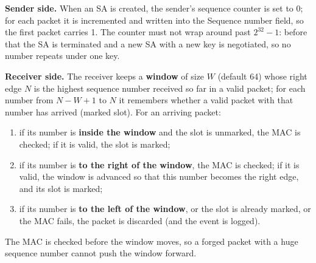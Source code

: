 \textbf{Sender side.} When an SA is created, the sender's sequence counter is set to 0; for each packet it is incremented and written into the Sequence number field, so the first packet carries 1. The counter must not wrap around past $2^{32} - 1$: before that the SA is terminated and a new SA with a new key is negotiated, so no number repeats under one key.

\textbf{Receiver side.} The receiver keeps a \textbf{window} of size $W$ (default 64) whose right edge $N$ is the highest sequence number received so far in a valid packet; for each number from $N - W + 1$ to $N$ it remembers whether a valid packet with that number has arrived (marked slot). For an arriving packet:
\begin{enumerate}
  \item if its number is \textbf{inside the window} and the slot is unmarked, the MAC is checked; if it is valid, the slot is marked;
  \item if its number is \textbf{to the right of the window}, the MAC is checked; if it is valid, the window is advanced so that this number becomes the right edge, and its slot is marked;
  \item if its number is \textbf{to the left of the window}, or the slot is already marked, or the MAC fails, the packet is discarded (and the event is logged).
\end{enumerate}
The MAC is checked before the window moves, so a forged packet with a huge sequence number cannot push the window forward.

